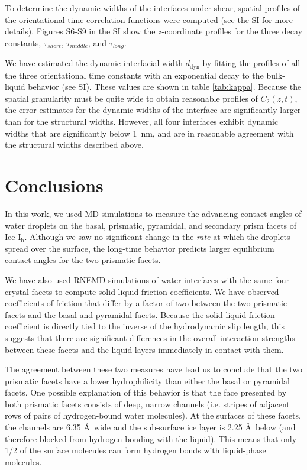 \documentclass{pnastwo}
\begin{document}
\begin{article}
To determine the dynamic widths of the interfaces under shear, spatial
profiles of the orientational time correlation functions were computed
(see the SI for more details). Figures S6-S9 in the SI show the
$z$-coordinate profiles for the three decay constants, $\tau_{short}$,
$\tau_{middle}$, and $\tau_{long}$.

We have estimated the dynamic interfacial width $d_\mathrm{dyn}$ by
fitting the profiles of all the three orientational time constants
with an exponential decay to the bulk-liquid behavior (see SI).  These
values are shown in table \ref{tab:kappa}.  Because the spatial
granularity must be quite wide to obtain reasonable profiles of
$C_2(z,t)$, the error estimates for the dynamic widths of the
interface are significantly larger than for the structural widths.
However, all four interfaces exhibit dynamic widths that are
significantly below 1~nm, and are in reasonable agreement with the
structural widths described above.

\section{Conclusions}
In this work, we used MD simulations to measure the advancing contact
angles of water droplets on the basal, prismatic, pyramidal, and
secondary prism facets of Ice-I$_\mathrm{h}$.  Although we saw no
significant change in the \textit{rate} at which the droplets spread
over the surface, the long-time behavior predicts larger equilibrium
contact angles for the two prismatic facets.  

We have also used RNEMD simulations of water interfaces with the same
four crystal facets to compute solid-liquid friction coefficients.  We
have observed coefficients of friction that differ by a factor of two
between the two prismatic facets and the basal and pyramidal facets.
Because the solid-liquid friction coefficient is directly tied to the
inverse of the hydrodynamic slip length, this suggests that there are
significant differences in the overall interaction strengths between
these facets and the liquid layers immediately in contact with them.

The agreement between these two measures have lead us to conclude that
the two prismatic facets have a lower hydrophilicity than either the
basal or pyramidal facets.  One possible explanation of this behavior
is that the face presented by both prismatic facets consists of deep,
narrow channels (i.e. stripes of adjacent rows of pairs of
hydrogen-bound water molecules).  At the surfaces of these facets,
the channels are 6.35 \AA\ wide and the sub-surface ice layer is 2.25
\AA\ below (and therefore blocked from hydrogen bonding with the
liquid).  This means that only 1/2 of the surface molecules can form
hydrogen bonds with liquid-phase molecules.


\end{article}
\end{document}

